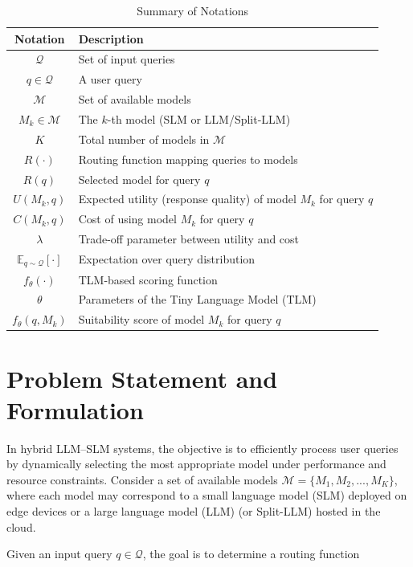 \documentclass[lettersize,journal]{IEEEtran}
\begin{document}
\begin{table}[t]
    \centering
    \caption{Summary of Notations}
    \label{tab:notations}
    \begin{tabular}{cp{6.5cm}}
    \hline
    \textbf{Notation} & \textbf{Description} \\
    \hline
    $\mathcal{Q}$ & Set of input queries \\
    $q \in \mathcal{Q}$ & A user query \\
    $\mathcal{M}$ & Set of available models \\
    $M_k \in \mathcal{M}$ & The $k$-th model (SLM or LLM/Split-LLM) \\
    $K$ & Total number of models in $\mathcal{M}$ \\
    $R(\cdot)$ & Routing function mapping queries to models \\
    $R(q)$ & Selected model for query $q$ \\
    $U(M_k, q)$ & Expected utility (response quality) of model $M_k$ for query $q$ \\
    $C(M_k, q)$ & Cost of using model $M_k$ for query $q$ \\
    $\lambda$ & Trade-off parameter between utility and cost \\
    $\mathbb{E}_{q \sim \mathcal{Q}}[\cdot]$ & Expectation over query distribution \\
    $f_{\theta}(\cdot)$ & TLM-based scoring function \\
    $\theta$ & Parameters of the Tiny Language Model (TLM) \\
    $f_{\theta}(q, M_k)$ & Suitability score of model $M_k$ for query $q$ \\
    \hline
    \end{tabular}
\end{table}

\section{Problem Statement and Formulation}
\label{sec:problem}
In hybrid LLM–SLM systems, the objective is to efficiently process user queries by dynamically selecting the most appropriate model under performance and resource constraints. Consider a set of available models $\mathcal{M} = \{M_1, M_2, ..., M_K\}$, where each model may correspond to a small language model (SLM) deployed on edge devices or a large language model (LLM) (or Split-LLM) hosted in the cloud.

Given an input query $q \in \mathcal{Q}$, the goal is to determine a routing function
\end{document}
